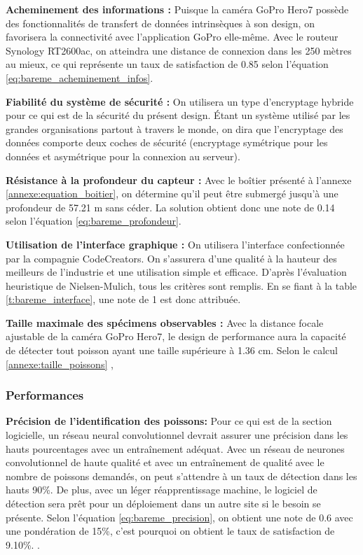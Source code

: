 \textbf{Acheminement des informations :}
Puisque la caméra GoPro Hero7 possède des fonctionnalités de transfert de données intrinsèques à son design, on favorisera la connectivité avec l’application GoPro elle-même. Avec le routeur Synology RT2600ac, on atteindra une distance de connexion dans les 250 mètres au mieux, ce qui représente un taux de satisfaction de 0.85 selon l'équation \ref{eq:bareme_acheminement_infos}.


\textbf{Fiabilité du système de sécurité :}
On utilisera un type d’encryptage hybride pour ce qui est de la sécurité du présent design. Étant un système utilisé par les grandes organisations partout à travers le monde, on dira que l’encryptage des données comporte deux coches de sécurité (encryptage symétrique pour les données et asymétrique pour la connexion au serveur). 

\textbf{Résistance à la profondeur du capteur : } Avec le boîtier présenté à l'annexe \ref{annexe:equation_boitier}, on détermine qu'il peut être submergé jusqu'à une profondeur de 57.21 m sans céder. La solution obtient donc une note de 0.14 selon l'équation \ref{eq:bareme_profondeur}.

\textbf{Utilisation de l’interface graphique :}
On utilisera l’interface confectionnée par la compagnie CodeCreators. On s’assurera d’une qualité à la hauteur des meilleurs de l’industrie et une utilisation simple et efficace. D’après l'évaluation heuristique de Nielsen-Mulich, tous les critères sont remplis. En se fiant à la table \ref{t:bareme_interface}, une note de 1 est donc attribuée.


\textbf{Taille maximale des spécimens observables :}
Avec la distance focale ajustable de la caméra GoPro Hero7, le design de performance aura la capacité de détecter tout poisson ayant une taille supérieure à 1.36 cm. Selon le calcul 
\ref{annexe:taille_poissons} ,

\subsubsection{Performances}

\textbf{Précision de l'identification des poissons:} Pour ce qui est de la section logicielle, un réseau neural convolutionnel devrait assurer une précision dans les hauts pourcentages avec un entraînement adéquat. Avec un réseau de neurones convolutionnel de haute qualité et avec un entraînement de qualité avec le nombre de poissons demandés, on peut s’attendre à un taux de détection dans les hauts 90\%. De plus, avec un léger réapprentissage machine, le logiciel de détection sera prêt pour un déploiement dans un autre site si le besoin se présente. Selon l’équation \ref{eq:bareme_precision}, on obtient une note de 0.6 avec une pondération de 15\%, c’est pourquoi on obtient le taux de satisfaction de 9.10\%. \cite{neural_yt}.


